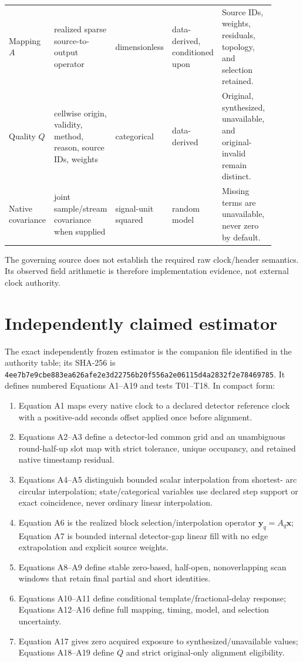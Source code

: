 \documentclass[11pt]{article}
\newcommand{\code}[1]{\nolinkurl{#1}}
\newcommand{\Aeq}[1]{Equation A#1}
\newcommand{\AuditCoreSHAPrint}{\code{4ee7b7e9cbe883ea626afe2e3d22756b}\allowbreak\code{20f556a2e06115d4a2832f2e78469785}}
\begin{document}
\begin{longtable}{L{0.13\linewidth}L{0.20\linewidth}L{0.15\linewidth}L{0.15\linewidth}L{0.27\linewidth}}
Mapping $A$ & realized sparse source-to-output operator & dimensionless & data-derived, conditioned upon & Source IDs, weights, residuals, topology, and selection retained.\\
Quality $Q$ & cellwise origin, validity, method, reason, source IDs, weights & categorical & data-derived & Original, synthesized, unavailable, and original-invalid remain distinct.\\
Native covariance & joint sample/stream covariance when supplied & signal-unit squared & random model & Missing terms are unavailable, never zero by default.\\
\bottomrule
\end{longtable}

The governing source does not establish the required raw clock/header
semantics.  Its observed field arithmetic is therefore implementation
evidence, not external clock authority.

\section{Independently claimed estimator}

The exact independently frozen estimator is the companion file identified in
the authority table; its SHA-256 is \AuditCoreSHAPrint.  It defines numbered
Equations A1--A19 and tests T01--T18.  In compact form:

\begin{enumerate}[leftmargin=2.2em]
\item \Aeq{1} maps every native clock to a declared detector reference clock
with a positive-add seconds offset applied once before alignment.
\item Equations A2--A3 define a detector-led common grid and an unambiguous
round-half-up slot map with strict tolerance, unique occupancy, and retained
native timestamp residual.
\item Equations A4--A5 distinguish bounded scalar interpolation from shortest-
arc circular interpolation; state/categorical variables use declared step
support or exact coincidence, never ordinary linear interpolation.
\item \Aeq{6} is the realized block selection/interpolation operator
$\boldsymbol y_q=A_q\boldsymbol x$; \Aeq{7} is bounded internal detector-gap
linear fill with no edge extrapolation and explicit source weights.
\item Equations A8--A9 define stable zero-based, half-open, nonoverlapping scan
windows that retain final partial and short identities.
\item Equations A10--A11 define conditional template/fractional-delay response;
Equations A12--A16 define full mapping, timing, model, and selection uncertainty.
\item \Aeq{17} gives zero acquired exposure to synthesized/unavailable values;
Equations A18--A19 define $Q$ and strict original-only alignment eligibility.
\end{enumerate}
\end{document}

